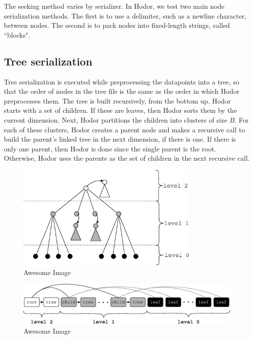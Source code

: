 \documentclass[11pt, oneside]{article}
\begin{document}
The seeking method varies by serializer. In Hodor, we test two main node
serialization methods. The first is to use a delimiter, such as a newline
character, between nodes. The second is to pack nodes into fixed-length
strings, called ``blocks". 

\subsection{Tree serialization}


Tree serialization is executed while preprocessing the datapoints into a tree,
so that the order of nodes in the tree file is the same as the order in which
Hodor preprocesses them. The tree is built recursively, from the bottom up.
Hodor starts with a set of children. If these are leaves, then Hodor sorts them
by the current dimension. Next, Hodor partitions the children into clusters of
size $B$. For each of these clusters, Hodor creates a parent node and makes a
recursive call to build the parent's linked tree in the next dimension, if
there is one. If there is only one parent, then Hodor is done since the single
parent is the root.  Otherwise, Hodor uses the parents as the set of children
in the next recursive call. 

\begin{figure}[p]
    \centering
    \includegraphics[width=0.8\textwidth]{fig1.eps}
    \caption{Awesome Image}
\end{figure}
\begin{figure}[p]
    \centering
    \includegraphics[width=1\textwidth]{fig2.eps}
    \caption{Awesome Image}
\end{figure}
\end{document}
